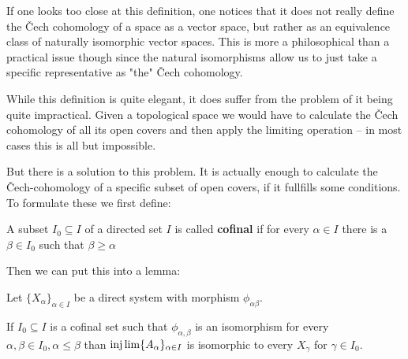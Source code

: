 \begin{remark}
If one looks too close at this definition, one notices that it does not really define the
Čech cohomology of a space as a vector space, but rather as an equivalence class
of naturally isomorphic vector spaces. This is more a philosophical than a practical issue though
since the natural isomorphisms allow us to just take a specific representative as "the" Čech cohomology.
\end{remark}

While this definition is quite elegant, it does suffer from the problem of it being quite impractical.
Given a topological space we would have to calculate the Čech cohomology of all its open covers and
then apply the limiting operation – in most cases this is all but impossible.

But there is a solution to this problem. It is actually enough to calculate the Čech-cohomology of
a specific subset of open covers, if it fullfills some conditions. To formulate these we first define:
\begin{definition}
A subset $I_0 \subseteq I$ of a directed set $I$ is called \textbf{cofinal} if for every $\alpha \in I$
there is a $\beta \in I_0$ such that $\beta \geqslant \alpha$
\end{definition}

Then we can put this into a lemma:
\begin{lemma}
	Let $\{X_\alpha\}_{\alpha \in I}$ be a direct system with morphism $\phi_{\alpha \beta}$.

	If $I_0 \subseteq I$ is a cofinal set such that $\phi_{\alpha, \beta}$ is an isomorphism for every
	$\alpha, \beta \in I_0, \alpha \leqslant \beta$ than $\injlim \{A_\alpha\}_{\alpha \in I}$ is isomorphic
	to every $X_\gamma$ for $\gamma \in I_0$.
\end{lemma}

